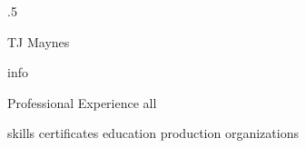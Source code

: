 \documentclass[10pt]{article}
\begin{document}
\moveleft.5\hoffset\centerline{\huge TJ Maynes}
{info}

\begin{section}{Professional Experience}
  {all}
\end{section}

{skills}
{certificates}
{education}
{production}
{organizations}
\end{document}
